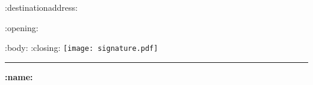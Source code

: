 \documentclass[ fontsize=12pt, parskip=full, paper=A4, fromalign=right, fromphone=false, fromemail=false, version=last,]{scrlttr2}
\begin{document}

\begin{letter}{:destinationaddress:}
\opening{:opening:}
:body:
:closing:
\vspace*{0.4cm} \newline
\texttt{[image: signature.pdf]}
\newline
\rule{29mm}{0.2mm} \newline
\textbf{:name:}
\end{letter}
\end{document}
